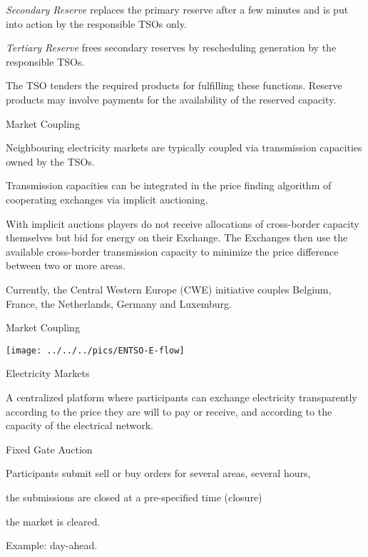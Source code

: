 	{\it Secondary Reserve} replaces the primary reserve after a few minutes and is put into action by the responsible TSOs only.

	{\it Tertiary Reserve} frees secondary reserves by rescheduling generation by the responsible TSOs.


The TSO tenders the required products for fulfilling these functions. Reserve products may involve payments for the availability of the reserved capacity.

{Market Coupling}


	Neighbouring electricity markets are typically coupled via transmission capacities owned by the TSOs.

	Transmission capacities can be integrated in the price finding algorithm of cooperating exchanges via implicit auctioning.

	With implicit auctions  players do not  receive allocations of cross-border capacity themselves but bid for energy on their Exchange. The Exchanges then use the available cross-border transmission capacity to minimize the price difference between two or more areas.

	Currently, the Central Western Europe (CWE) initiative couples Belgium, France, the Netherlands, Germany and Luxemburg.


{Market Coupling}
\begin{center}
\texttt{[image: ../../../pics/ENTSO-E-flow]}
\end{center}

{Electricity Markets}

A centralized platform where participants can exchange electricity transparently
according to the price they are will to pay or receive, and according to the capacity of
the electrical network.


	Fixed Gate Auction


	Participants submit sell or buy orders for several areas, several hours,

	the submissions are closed at a pre-specified time (closure)

	the market is cleared.

	Example: day-ahead.

